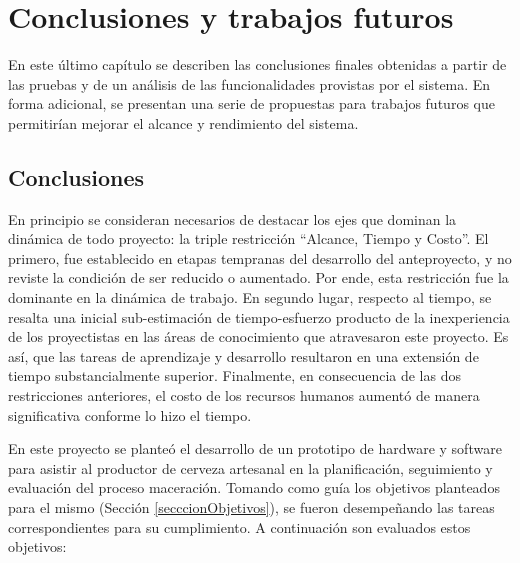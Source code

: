\chapter{Conclusiones y trabajos futuros}
\par
En este último capítulo se describen las conclusiones finales obtenidas a partir de las pruebas y de un análisis de las funcionalidades provistas por el sistema. En forma adicional, se presentan una serie de propuestas para trabajos futuros que permitirían mejorar el alcance y rendimiento del sistema.

\section{Conclusiones} %

\par En principio se consideran necesarios de destacar los ejes que dominan la dinámica de todo proyecto: la triple restricción ``Alcance, Tiempo y Costo''. El primero, fue establecido en etapas tempranas del desarrollo del anteproyecto, y no reviste la condición de ser reducido o aumentado. Por ende, esta restricción fue la dominante en la dinámica de trabajo. En segundo lugar, respecto al tiempo, se resalta una inicial sub-estimación de tiempo-esfuerzo producto de la inexperiencia de los proyectistas en las áreas de conocimiento que atravesaron este proyecto. Es así, que las tareas de aprendizaje y desarrollo resultaron en una extensión de tiempo substancialmente superior. Finalmente, en consecuencia de las dos restricciones anteriores, el costo de los recursos humanos aumentó de manera significativa conforme lo hizo el tiempo.

\par En este proyecto se planteó el desarrollo de un prototipo de hardware y software para asistir al productor de cerveza artesanal en la planificación, seguimiento y evaluación del proceso maceración. Tomando como guía los objetivos planteados para el mismo (Sección \ref{secccionObjetivos}), se fueron desempeñando las tareas correspondientes para su cumplimiento. A continuación son evaluados estos objetivos:

